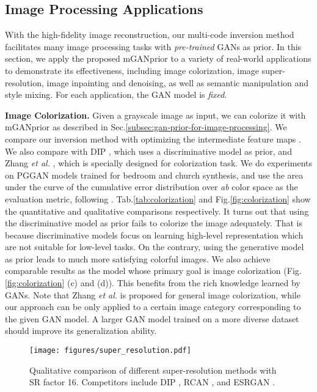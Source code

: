 \documentclass[10pt,twocolumn,letterpaper]{article}
\begin{document}
\subsection{Image Processing Applications}\label{subsec:application}
With the high-fidelity image reconstruction, our multi-code inversion method facilitates many image processing tasks with \emph{pre-trained} GANs as prior.
In this section, we apply the proposed mGANprior to a variety of real-world applications to demonstrate its effectiveness, including image colorization, image super-resolution, image inpainting and denoising, as well as semantic manipulation and style mixing.
For each application, the GAN model is \emph{fixed}.


\vspace{2pt}\noindent\textbf{Image Colorization.}
Given a grayscale image as input, we can colorize it with mGANprior as described in Sec.\ref{subsec:gan-prior-for-image-processing}.
We compare our inversion method with optimizing the intermediate feature maps \cite{bau2019semantic}.
We also compare with DIP \cite{ulyanov2018deep}, which uses a discriminative model as prior, and Zhang \emph{et al.} \cite{zhang2016colorful}, which is specially designed for colorization task.
We do experiments on PGGAN models trained for bedroom and church synthesis, and use the area under the curve of the cumulative error distribution over \emph{ab} color space as the evaluation metric, following \cite{zhang2016colorful}.
Tab.\ref{tab:colorization} and Fig.\ref{fig:colorization} show the quantitative and qualitative comparisons respectively.
It turns out that using the discriminative model as prior fails to colorize the image adequately.
That is because discriminative models focus on learning high-level representation which are not suitable for low-level tasks.
On the contrary, using the generative model as prior leads to much more satisfying colorful images.
We also achieve comparable results as the model whose primary goal is image colorization (Fig.\ref{fig:colorization} (c) and (d)).
This benefits from the rich knowledge learned by GANs.
Note that Zhang \emph{et al.} \cite{zhang2016colorful} is proposed for general image colorization, while our approach can be only applied to a certain image category corresponding to the given GAN model.
A larger GAN model trained on a more diverse dataset should improve its generalization ability.


\begin{figure}[t]
  \centering
  \texttt{[image: figures/super\_resolution.pdf]}
  \vspace{-20pt}
  \captionsetup{font=small}
  \caption{
    Qualitative comparison of different super-resolution methods with SR factor 16.
Competitors include DIP \cite{ulyanov2018deep}, RCAN \cite{rcan}, and ESRGAN \cite{wang2018esrgan}.
  }
  \label{fig:super-resolution}
  \vspace{-15pt}
\end{figure}
\end{document}
